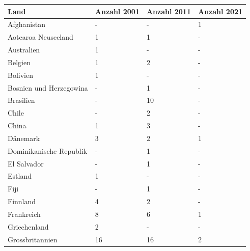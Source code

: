 \documentclass[a4paper,
fontsize=11pt,
oneside,
numbers=noperiodatend,
parskip=half-,
bibliography=totoc,
final
]{scrartcl}
\begin{document}
\begin{longtable}{llll}
\textbf{Land}             & \textbf{Anzahl 2001} & \textbf{Anzahl 2011} & \textbf{Anzahl 2021} \\
\hline
Afghanistan               & -                    & -                    & 1                    \\
Aotearoa   Neuseeland     & 1                    & 1                    & -                    \\
Australien                & 1                    & -                    & -                    \\
Belgien                   & 1                    & 2                    & -                    \\
Bolivien                  & 1                    & -                    & -                    \\
Bosnien und   Herzegowina & -                    & 1                    & -                    \\
Brasilien                 & -                    & 10                   & -                    \\
Chile                     & -                    & 2                    & -                    \\
China                     & 1                    & 3                    & -                    \\
Dänemark                  & 3                    & 2                    & 1                    \\
Dominikanische   Republik & -                    & 1                    & -                    \\
El Salvador               & -                    & 1                    & -                    \\
Estland                   & 1                    & -                    & -                    \\
Fiji                      & -                    & 1                    & -                    \\
Finnland                  & 4                    & 2                    & -                    \\
Frankreich                & 8                    & 6                    & 1                    \\
Griechenland              & 2                    & -                    & -                    \\
Grossbritannien           & 16                   & 16                   & 2                    \\

\end{longtable}
\end{document}
